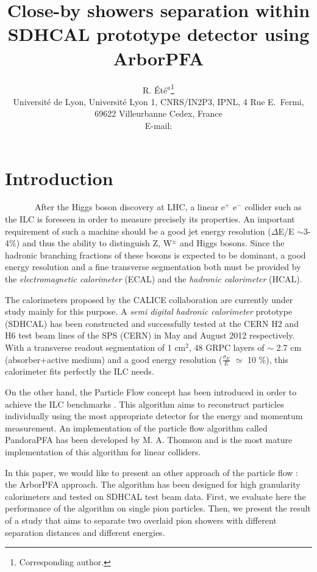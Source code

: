 \documentclass[cits]{JINST}
\title{Close-by showers separation within SDHCAL prototype detector using ArborPFA}
\author{R. \'Et\'e$^a$\thanks{Corresponding author.} \\%
\llap{$^a$} Universit\'e de Lyon, Universit\'e Lyon 1, CNRS/IN2P3, 
 IPNL, 4 Rue E.~Fermi, 69622 Villeurbanne Cedex, France\\
 
 
 E-mail: \email{rete@ipnl.in2p3.fr}
 }
\begin{document}

\section{Introduction}

~~~~~~~After the Higgs boson discovery at LHC, a linear e$^+$ e$^-$ collider such as the ILC is foreseen in order to measure precisely its properties. An important requirement of such a machine should be a good jet energy resolution ($\Delta$E/E $\sim$3-4\%) and thus the ability to distinguish Z, W$^{\pm}$ and Higgs bosons. Since the hadronic branching fractions of these bosons is expected to be dominant, a good energy resolution and a fine transverse segmentation both must be provided by the \textit{electromagnetic calorimeter} (ECAL) and the \textit{hadronic calorimeter} (HCAL).

The calorimeters proposed by the CALICE collaboration are currently under study mainly for this purpose. A \textit{semi digital hadronic calorimeter} prototype (SDHCAL) has been constructed \cite{sdhcal-paper} and successfully tested at the CERN H2 and H6 test beam lines of the SPS (CERN) in May and August 2012 respectively. With a transverse readout segmentation of 1 cm$^2$, 48 GRPC layers of $\sim$ 2.7 cm (absorber+active medium) and a good energy resolution ($\frac{\sigma_{E}}{E}$ $\simeq$ 10 \%), this calorimeter fits perfectly the ILC needs. 

On the other hand, the Particle Flow concept has been introduced in order to achieve the ILC benchmarks \cite{ilc-tdr}. This algorithm aims to reconstruct particles individually using the most appropriate detector for the energy and momentum measurement. An implementation of the particle flow algorithm called PandoraPFA has been developed by M. A. Thomson \cite{pandora-pfa} and is the most mature implementation of this algorithm for linear colliders.

In this paper, we would like to present an other approach of the particle flow : the ArborPFA approach. The algorithm has been designed for high granularity calorimeters and tested on SDHCAL test beam data. First, we evaluate here the performance of the algorithm on single pion particles. Then, we present the result of a study that aims to separate two overlaid pion showers with different separation distances and different energies.
\end{document}
